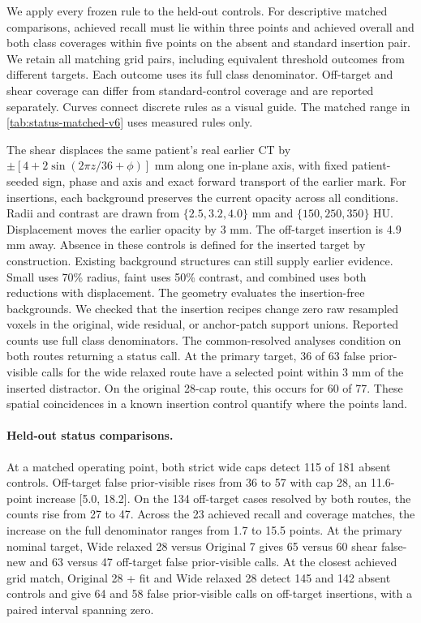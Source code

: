 We apply every frozen rule to the held-out controls. For descriptive matched comparisons, achieved recall must lie within three points and achieved overall and both class coverages within five points on the absent and standard insertion pair. We retain all matching grid pairs, including equivalent threshold outcomes from different targets. Each outcome uses its full class denominator. Off-target and shear coverage can differ from standard-control coverage and are reported separately. Curves connect discrete rules as a visual guide. The matched range in \cref{tab:status-matched-v6} uses measured rules only.

The shear displaces the same patient's real earlier CT by $\pm[4+2\sin(2\pi z/36+\phi)]$ mm along one in-plane axis, with fixed patient-seeded sign, phase and axis and exact forward transport of the earlier mark. For insertions, each background preserves the current opacity across all conditions. Radii and contrast are drawn from $\{2.5,3.2,4.0\}$ mm and $\{150,250,350\}$ HU. Displacement moves the earlier opacity by 3 mm. The off-target insertion is 4.9 mm away. Absence in these controls is defined for the inserted target by construction. Existing background structures can still supply earlier evidence. Small uses 70\% radius, faint uses 50\% contrast, and combined uses both reductions with displacement. The geometry evaluates the insertion-free backgrounds. We checked that the insertion recipes change zero raw resampled voxels in the original, wide residual, or anchor-patch support unions. Reported counts use full class denominators. The common-resolved analyses condition on both routes returning a status call. At the primary target, 36 of 63 false prior-visible calls for the wide relaxed route have a selected point within 3 mm of the inserted distractor. On the original 28-cap route, this occurs for 60 of 77. These spatial coincidences in a known insertion control quantify where the points land.

\paragraph{Held-out status comparisons.}
At a matched operating point, both strict wide caps detect 115 of 181 absent controls. Off-target false prior-visible rises from 36 to 57 with cap 28, an 11.6-point increase [5.0, 18.2]. On the 134 off-target cases resolved by both routes, the counts rise from 27 to 47. Across the 23 achieved recall and coverage matches, the increase on the full denominator ranges from 1.7 to 15.5 points. At the primary nominal target, Wide relaxed 28 versus Original 7 gives 65 versus 60 shear false-new and 63 versus 47 off-target false prior-visible calls. At the closest achieved grid match, Original 28 + fit and Wide relaxed 28 detect 145 and 142 absent controls and give 64 and 58 false prior-visible calls on off-target insertions, with a paired interval spanning zero.

